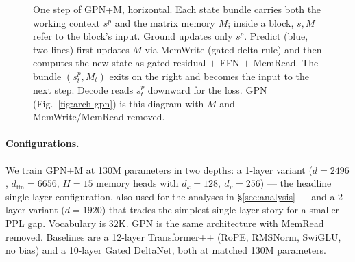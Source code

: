\documentclass{article}
\begin{document}
\begin{figure}[!ht]
\centering
{}
\caption{One step of GPN+M, horizontal. Each state bundle carries
both the working context $s^p$ and the matrix memory $M$; inside a
block, $s, M$ refer to the block's input. Ground updates only
$s^p$. Predict (blue, two lines) first updates $M$ via MemWrite
(gated delta rule) and then computes the new state as gated
residual $+$ FFN $+$ MemRead. The bundle $(s^p_t, M_t)$ exits on
the right and becomes the input to the next step. Decode reads
$s^p_t$ downward for the loss. GPN (Fig.~\ref{fig:arch-gpn}) is
this diagram with $M$ and MemWrite/MemRead removed.}
\label{fig:arch}
\end{figure}

\paragraph{Configurations.} We train GPN+M at 130M parameters in
two depths: a 1-layer variant ($d=2496$, $d_{\text{ffn}}=6656$, $H=15$
memory heads with $d_k=128,\ d_v=256$) --- the headline single-layer
configuration, also used for the analyses in \S\ref{sec:analysis} ---
and a 2-layer variant ($d=1920$) that trades the simplest
single-layer story for a smaller PPL gap. Vocabulary is $32$K. GPN
is the same architecture with MemRead removed. Baselines are a
12-layer Transformer++ (RoPE, RMSNorm, SwiGLU, no bias) and a
10-layer Gated DeltaNet, both at matched 130M parameters.
\end{document}
